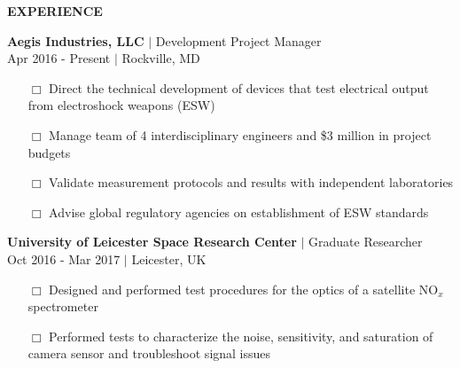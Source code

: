 \documentclass[10pt]{article}
\begin{document}
\begin{minipage}[t]{0.67\textwidth}

{\color{gray}
{\Large \uppercase{\textbf{Experience}}} \hspace{.1cm} \sout{\hfill} \\[-.2cm]   
}

{\sc\textbf{Aegis Industries, LLC} $\vert$  Development Project Manager}\\
{\color{gray} Apr 2016 - Present $\vert$ Rockville, MD} \\[-.4cm]
{\small
\begin{itemize}
\item[\tiny $\Box$] Direct the technical development of devices that test electrical output from electroshock weapons (ESW)
\item[\tiny $\Box$] Manage team of 4 interdisciplinary engineers and \$3 million in project budgets
\item[\tiny $\Box$] Validate measurement protocols and results with independent laboratories
\item[\tiny $\Box$] Advise global regulatory agencies on establishment of ESW standards\\
\end{itemize}
}

\textbf{University of Leicester Space Research Center} $\vert$ {\sc Graduate Researcher}\\
{\color{gray} Oct 2016 - Mar 2017 $\vert$ Leicester, UK }\\[-.4cm]

\begin{itemize}
\small
\item[\tiny $\Box$] Designed and performed test procedures for the optics of a satellite NO$_x$ spectrometer
\item[\tiny $\Box$] Performed tests to characterize the noise, sensitivity, and saturation of camera sensor and troubleshoot signal issues \\
\end{itemize}


\end{minipage}
\end{document}
